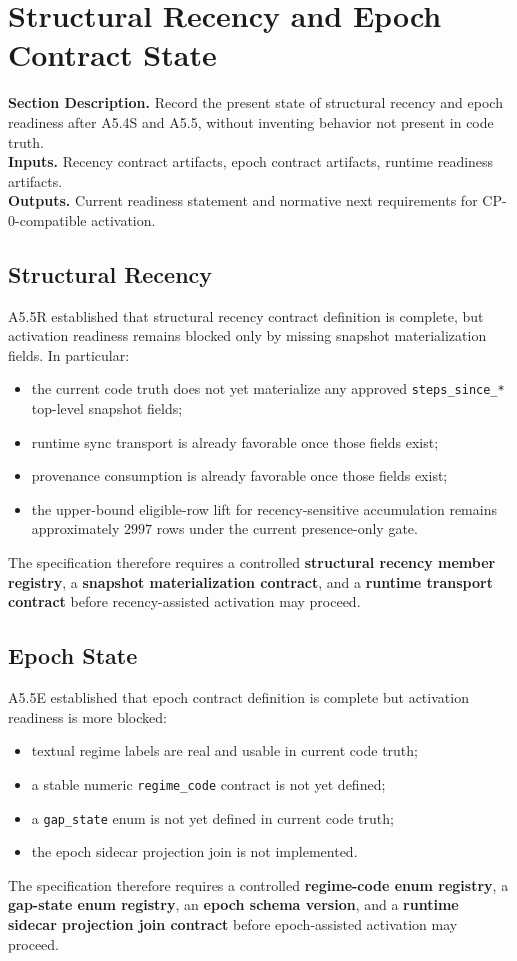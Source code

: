 \documentclass[11pt]{report}
\newcommand{\meta}[3]{\textbf{Section Description.} #1\\
\textbf{Inputs.} #2\\
\textbf{Outputs.} #3\par}
\begin{document}
\section{Structural Recency and Epoch Contract State}
\meta{Record the present state of structural recency and epoch readiness after A5.4S and A5.5, without inventing behavior not present in code truth.}{Recency contract artifacts, epoch contract artifacts, runtime readiness artifacts.}{Current readiness statement and normative next requirements for CP-0-compatible activation.}

\subsection{Structural Recency}
A5.5R established that structural recency contract definition is complete, but activation readiness remains blocked only by missing snapshot materialization fields. In particular:
\begin{itemize}
    \item the current code truth does not yet materialize any approved \texttt{steps\_since\_*} top-level snapshot fields;
    \item runtime sync transport is already favorable once those fields exist;
    \item provenance consumption is already favorable once those fields exist;
    \item the upper-bound eligible-row lift for recency-sensitive accumulation remains approximately $2997$ rows under the current presence-only gate.
\end{itemize}
The specification therefore requires a controlled \textbf{structural recency member registry}, a \textbf{snapshot materialization contract}, and a \textbf{runtime transport contract} before recency-assisted activation may proceed.

\subsection{Epoch State}
A5.5E established that epoch contract definition is complete but activation readiness is more blocked:
\begin{itemize}
    \item textual regime labels are real and usable in current code truth;
    \item a stable numeric \texttt{regime\_code} contract is not yet defined;
    \item a \texttt{gap\_state} enum is not yet defined in current code truth;
    \item the epoch sidecar projection join is not implemented.
\end{itemize}
The specification therefore requires a controlled \textbf{regime-code enum registry}, a \textbf{gap-state enum registry}, an \textbf{epoch schema version}, and a \textbf{runtime sidecar projection join contract} before epoch-assisted activation may proceed.
\end{document}
